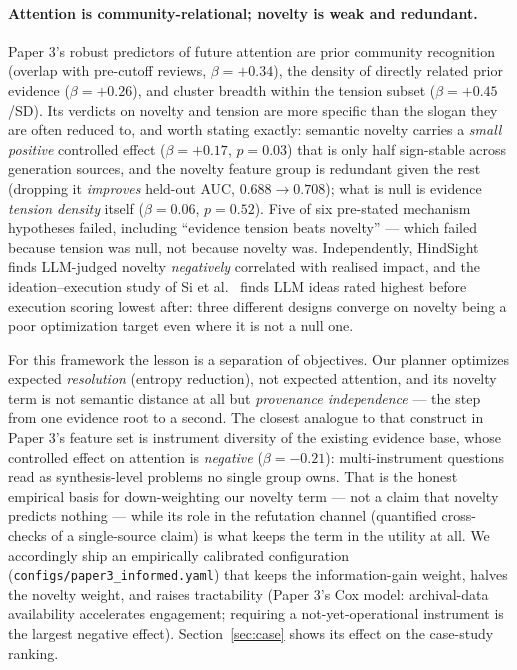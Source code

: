 \documentclass[11pt]{article}
\begin{document}
\paragraph{Attention is community-relational; novelty is weak and
redundant.} Paper 3's robust predictors of future attention are prior
community recognition (overlap with pre-cutoff reviews,
$\beta = +0.34$), the density of directly related prior evidence
($\beta = +0.26$), and cluster breadth within the tension subset
($\beta = +0.45$/SD). Its verdicts on novelty and tension are more
specific than the slogan they are often reduced to, and worth stating
exactly: semantic novelty carries a \emph{small positive} controlled
effect ($\beta = +0.17$, $p = 0.03$) that is only half sign-stable
across generation sources, and the novelty feature group is redundant
given the rest (dropping it \emph{improves} held-out AUC, $0.688 \to
0.708$); what is null is evidence \emph{tension density} itself
($\beta = 0.06$, $p = 0.52$). Five of six pre-stated mechanism
hypotheses failed, including ``evidence tension beats novelty'' ---
which failed because tension was null, not because novelty was.
Independently, HindSight~\cite{hindsight} finds LLM-judged novelty
\emph{negatively} correlated with realised impact, and the
ideation--execution study of Si et al.~\cite{si2025execution} finds
LLM ideas rated highest before execution scoring lowest after: three
different designs converge on novelty being a poor optimization target
even where it is not a null one.

For this framework the lesson is a separation of objectives. Our
planner optimizes expected \emph{resolution} (entropy reduction), not
expected attention, and its novelty term is not semantic distance at
all but \emph{provenance independence} --- the step from one evidence
root to a second. The closest analogue to that construct in Paper 3's
feature set is instrument diversity of the existing evidence base,
whose controlled effect on attention is \emph{negative}
($\beta = -0.21$): multi-instrument questions read as synthesis-level
problems no single group owns. That is the honest empirical basis for
down-weighting our novelty term --- not a claim that novelty predicts
nothing --- while its role in the refutation channel (quantified
cross-checks of a single-source claim) is what keeps the term in the
utility at all. We accordingly ship an empirically calibrated
configuration
(\texttt{configs/paper3\_informed.yaml}) that keeps the
information-gain weight, halves the novelty weight, and raises
tractability (Paper 3's Cox model: archival-data availability
accelerates engagement; requiring a not-yet-operational instrument is
the largest negative effect). Section~\ref{sec:case} shows its effect
on the case-study ranking.
\end{document}
